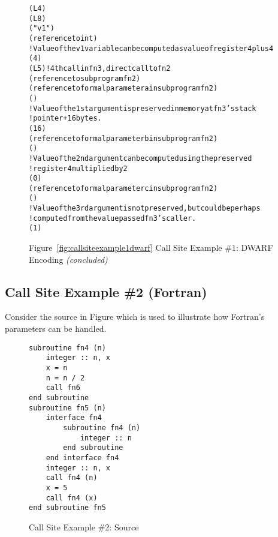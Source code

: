 \begin{figure}
\begin{dwflisting}
\begin{alltt}
\DWTAGlexicalblock
    \DWATlowpc(L4)
    \DWAThighpc(L8)
    \DWTAGvariable
        \DWATname("v1")
        \DWATtype(reference to int)
        ! Value of the v1 variable can be computed as value of register 4 plus 4
        \DWATlocation(\DWOPbregfour{} 4 \DWOPstackvalue)
    \DWTAGcallsite
        \DWATcallreturnpc(L5) ! 4th call in fn3, direct call to fn2
        \DWATcalltarget(reference to subprogram fn2)
        \DWTAGcallsiteparameter
            \DWATcallparameter(reference to formal parameter a in subprogram fn2)
            \DWATlocation(\DWOPregzero)
            ! Value of the 1st argument is preserved in memory at fn3's stack 
            !   pointer + 16 bytes.
            \DWATcallvalue(\DWOPbregthree{} 16 \DWOPderef)
        \DWTAGcallsiteparameter
            \DWATcallparameter(reference to formal parameter b in subprogram fn2)
            \DWATlocation(\DWOPregone)
            ! Value of the 2nd argument can be computed using the preserved 
            !   register 4 multiplied by 2
            \DWATcallvalue(\DWOPlittwo{} \DWOPregfour{} 0 \DWOPmul)
        \DWTAGcallsiteparameter
            \DWATcallparameter(reference to formal parameter c in subprogram fn2)
            \DWATlocation(\DWOPregtwo)
            ! Value of the 3rd argument is not preserved, but could be perhaps 
            ! computed from the value passed fn3's caller.
            \DWATcallvalue(\DWOPentryvalue{} 1 \DWOPregzero)
\end{alltt}
\end{dwflisting}
\begin{center}
\vspace{0.4cm}
Figure~\ref{fig:callsiteexample1dwarf} Call Site Example \#1: DWARF Encoding \textit{(concluded)}
\end{center}
\end{figure}

\clearpage
\subsection{Call Site Example \#2 (Fortran)}
Consider the  source in 
Figure 
which is used to illustrate how Fortran's 
parameters can be handled.

\begin{figure}[h]
\begin{lstlisting}
subroutine fn4 (n)
    integer :: n, x
    x = n
    n = n / 2
    call fn6
end subroutine
subroutine fn5 (n)
    interface fn4
        subroutine fn4 (n)
            integer :: n
        end subroutine
    end interface fn4
    integer :: n, x
    call fn4 (n)
    x = 5
    call fn4 (x)
end subroutine fn5
\end{lstlisting}
\caption{Call Site Example \#2: Source}
\label{fig:callsiteexample2source}
\end{figure}

